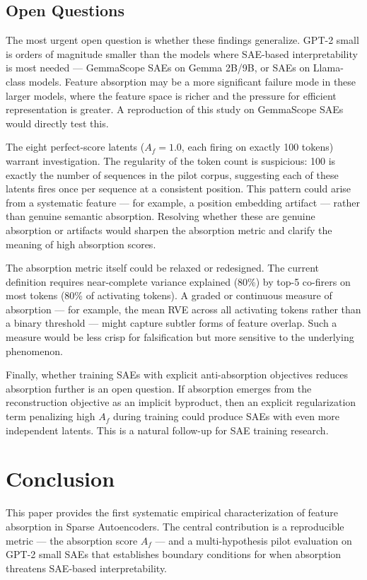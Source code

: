 \documentclass{article}
\begin{document}
\subsection{Open Questions}

The most urgent open question is whether these findings generalize. GPT-2 small is orders of magnitude smaller than the models where SAE-based interpretability is most needed --- GemmaScope SAEs on Gemma 2B/9B, or SAEs on Llama-class models. Feature absorption may be a more significant failure mode in these larger models, where the feature space is richer and the pressure for efficient representation is greater. A reproduction of this study on GemmaScope SAEs would directly test this.

The eight perfect-score latents ($A_f = 1.0$, each firing on exactly 100 tokens) warrant investigation. The regularity of the token count is suspicious: 100 is exactly the number of sequences in the pilot corpus, suggesting each of these latents fires once per sequence at a consistent position. This pattern could arise from a systematic feature --- for example, a position embedding artifact --- rather than genuine semantic absorption. Resolving whether these are genuine absorption or artifacts would sharpen the absorption metric and clarify the meaning of high absorption scores.

The absorption metric itself could be relaxed or redesigned. The current definition requires near-complete variance explained (80\%) by top-5 co-firers on most tokens (80\% of activating tokens). A graded or continuous measure of absorption --- for example, the mean RVE across all activating tokens rather than a binary threshold --- might capture subtler forms of feature overlap. Such a measure would be less crisp for falsification but more sensitive to the underlying phenomenon.

Finally, whether training SAEs with explicit anti-absorption objectives reduces absorption further is an open question. If absorption emerges from the reconstruction objective as an implicit byproduct, then an explicit regularization term penalizing high $A_f$ during training could produce SAEs with even more independent latents. This is a natural follow-up for SAE training research.


\section{Conclusion}

This paper provides the first systematic empirical characterization of feature absorption in Sparse Autoencoders. The central contribution is a reproducible metric --- the absorption score $A_f$ --- and a multi-hypothesis pilot evaluation on GPT-2 small SAEs that establishes boundary conditions for when absorption threatens SAE-based interpretability.
\end{document}
